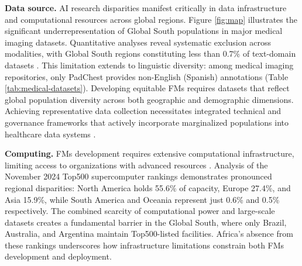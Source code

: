 \textbf{Data source.} AI research disparities manifest critically in data infrastructure and computational resources across global regions. Figure \ref{fig:map} illustrates the significant underrepresentation of Global South populations in major medical imaging datasets. Quantitative analyses reveal systematic exclusion across modalities, with Global South regions constituting less than 0.7\% of text-domain datasets \cite{longpre_bridging_2024}. This limitation extends to linguistic diversity: among medical imaging repositories, only PadChest provides non-English (Spanish) annotations (Table \ref{tab:medical-datasets}). Developing equitable FMs requires datasets that reflect global population diversity across both geographic and demographic dimensions. Achieving representative data collection necessitates integrated technical and governance frameworks that actively incorporate marginalized populations into healthcare data systems \cite{world_health_organization_conceptual_2010, chen_ethical_2021, bailey_structural_2017, williams_understanding_2019}.

\textbf{Computing.} FMs development requires extensive computational infrastructure, limiting access to organizations with advanced resources \cite{cottier_rising_2024}. Analysis of the November 2024 Top500 supercomputer rankings demonstrates pronounced regional disparities: North America holds 55.6\% of capacity, Europe 27.4\%, and Asia 15.9\%, while South America and Oceania represent just 0.6\% and 0.5\% respectively. The combined scarcity of computational power and large-scale datasets creates a fundamental barrier in the Global South, where only Brazil, Australia, and Argentina maintain Top500-listed facilities. Africa's absence from these rankings underscores how infrastructure limitations constrain both FMs development and deployment.

